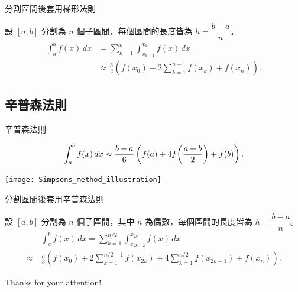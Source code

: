 \documentclass{beamer}
\newcommand{\Left} {\mathopen{}\mathclose\bgroup\left}
\newcommand{\Right}{\aftergroup\egroup\right}
\theoremstyle{remark}
\begin{document}
\begin{CJK}{UTF8}{bsmi}
\begin{frame}{分割區間後套用梯形法則}
  \begin{theorem}
    設 $[a,b]$ 分割為 $n$ 個子區間，每個區間的長度皆為 $h = \dfrac{b-a}{n}$。
    \begin{align*}
      \int_a^b f(x)\,dx &= \sum_{k=1}^{n} \int_{x_{k-1}}^{x_{k}} f(x)\,dx\\
	&\approx \frac{h}{2} \left( f(x_0) + 2 \sum_{k=1}^{n-1} f(x_{k}) + f(x_n) \right).
    \end{align*}
  \end{theorem}
\end{frame}

\subsection{辛普森法則}
\begin{frame}{辛普森法則}
  \begin{theorem}
    \[\int_a^b f(x)\,dx \approx \frac{b-a}{6} \left( f(a) + 4f \Left( \frac{a+b}{2} \Right) + f(b) \right).\]
  \end{theorem}
  \begin{center}
    \texttt{[image: Simpsons\_method\_illustration]}
  \end{center}
\end{frame}

\begin{frame}{分割區間後套用辛普森法則}
  \begin{theorem}
    設 $[a,b]$ 分割為 $n$ 個子區間，其中 $n$ 為偶數，每個區間的長度皆為 $h = \dfrac{b-a}{n}$。
    \begin{align*}
      &\:\int_a^b f(x)\,dx = \sum_{k=1}^{n/2} \int_{x_{2k - 2}}^{x_{2k}} f(x)\,dx\\
      \approx&\: \frac{h}{3} \left( f(x_0) + 2 \sum_{k=1}^{n/2 - 1} f(x_{2k}) + 4 \sum_{k=1}^{n/2} f(x_{2k - 1}) + f(x_n)
	  \right).
    \end{align*}
  \end{theorem}
\end{frame}

\begin{frame}
  \begin{center}
    \huge Thanks for your attention!
  \end{center}
\end{frame}
\end{CJK}
\end{document}
